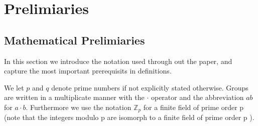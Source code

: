 \chapter{Prelimiaries}\label{chapter:prelimiaries}

\theoremstyle{definition}
\newtheorem{definition}{Definition}[section]

\section{Mathematical Prelimiaries}
In this section we introduce the notation used through out the paper, and capture the most important prerequisits in definitions. 

We let $p$ and $q$ denote prime numbers if not explicitly stated otherwise. 
Groups are written in a multiplicate manner with the  $\cdot$ operator and the abbreviation $ab$ for $a \cdot b$.
Furthermore we use the notation $\mathbb{Z}_p$ for a finite field of prime order p (note that the integers modulo p are isomorph to a finite field of prime order p \parencite{algebra}).

